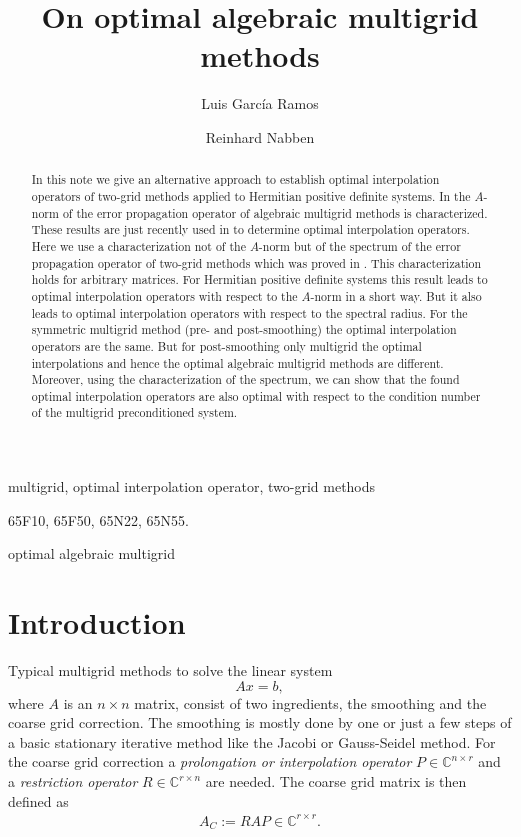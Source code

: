 \documentclass[final]{siamltex}
\author{
Luis Garc\'{i}a Ramos\footnotemark[1]
\and
Reinhard Nabben\footnotemark[1]
}
\title{On optimal algebraic multigrid methods}
\newcommand{\innCrr}{\in\mathbb{C}^{r\times r}}
\newcommand{\beq}{\begin{eqnarray}}
\newcommand{\eeq}{\end{eqnarray}}
\numberwithin{equation}{section}
\newcommand{\Crn}{\mathbb{C}^{r \times n}}
\newcommand{\Cnr}{\mathbb{C}^{n \times r}}
\begin{document}
\maketitle
\renewcommand{\thefootnote}{\fnsymbol{footnote}}

\renewcommand{\thefootnote}{\arabic{footnote}}
\begin{abstract}
  In this note we give an alternative approach  to establish optimal interpolation operators of two-grid methods applied to Hermitian positive  definite  systems.  In \cite{FalVZ05,Zik08} the $A$-norm of the error propagation operator of algebraic multigrid methods is characterized. These results are just recently used in \cite{XuZ17, Bra18} to determine  optimal interpolation operators. Here we use a characterization not of the $A$-norm but of the spectrum of the  error propagation operator of two-grid methods which was proved in  \cite{GarKN18}. This characterization holds for arbitrary matrices. For Hermitian positive definite systems this result   leads to   optimal interpolation operators with respect to the $A$-norm in a short way. But it also leads  to optimal interpolation operators with respect to the spectral radius. For the symmetric multigrid method (pre- and  post-smoothing) the optimal interpolation operators are  the same. But for post-smoothing only multigrid the optimal interpolations and hence the optimal algebraic multigrid 
methods are  different.  Moreover, using the  characterization of the spectrum, we can show that the found   optimal interpolation operators are also optimal  with 
respect to the condition number  of the multigrid preconditioned system.  
\end{abstract}


\begin{keywords}
multigrid, optimal interpolation operator, two-grid methods
\end{keywords}

\begin{AMS}
65F10, 65F50, 65N22, 65N55.
\end{AMS}

\pagestyle{myheadings}
\thispagestyle{plain}
 {optimal algebraic multigrid}

\section{Introduction}
Typical multigrid methods to solve the linear system 
\[
Ax = b,
\]
where $A$ is an $n \times n$ matrix, consist  of two ingredients, the smoothing and  the 
coarse grid correction. The smoothing is mostly done by one or just a few  steps of a  basic stationary iterative method like the Jacobi or Gauss-Seidel method.  For the coarse grid correction 
 a {\it prolongation or interpolation
operator} $P \in \Cnr$ and a    {\it
restriction operator} $R \in \Crn$  are needed. The coarse grid matrix is then defined as
\beq \label{def:multAC}
A_C :=  RAP \innCrr.
\eeq 
\end{document}
